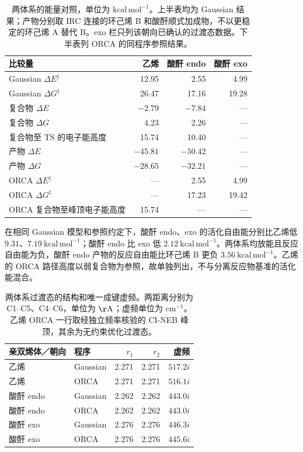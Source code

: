 \documentclass[a4paper,12pt]{article}
\newcommand{\kcalmol}{\mathrm{kcal\,mol^{-1}}}
\begin{document}
\begin{table}[htbp]
\centering\small
\caption{两体系的能量对照，单位为 $\kcalmol$。上半表均为 Gaussian 结果；产物分别取 IRC 连接的环己烯 B 和酸酐顺式加成物，不以更稳定的环己烯 A 替代 B。exo 栏只列该朝向已确认的过渡态数据。下半表列 ORCA 的同程序参照结果。}
\label{tab:systems-energy}
\begin{tabular}{lrrr}
\toprule
比较量 & 乙烯 & 酸酐 endo & 酸酐 exo\\
\midrule
Gaussian $\Delta E^{\ddagger}$ & 12.95 & 2.55 & 4.99\\
Gaussian $\Delta G^{\ddagger}$ & 26.47 & 17.16 & 19.28\\
复合物 $\Delta E$ & $-2.79$ & $-7.84$ & ---\\
复合物 $\Delta G$ & 4.23 & 2.26 & ---\\
复合物至 TS 的电子能高度 & 15.74 & 10.40 & ---\\
产物 $\Delta E$ & $-45.81$ & $-50.42$ & ---\\
产物 $\Delta G$ & $-28.65$ & $-32.21$ & ---\\
\midrule
ORCA $\Delta E^{\ddagger}$ & --- & 2.55 & 4.99\\
ORCA $\Delta G^{\ddagger}$ & --- & 17.23 & 19.42\\
ORCA 复合物至峰顶电子能高度 & 15.74 & --- & ---\\
\bottomrule
\end{tabular}
\end{table}

在相同 Gaussian 模型和参照约定下，酸酐 endo、exo 的活化自由能分别比乙烯低 $9.31$、$7.19\ \kcalmol$；酸酐 endo 比 exo 低 $2.12\ \kcalmol$。两体系均放能且反应自由能为负，酸酐 endo 产物的反应自由能比环己烯 B 更负 $3.56\ \kcalmol$。乙烯的 ORCA 路径高度以弱复合物为参照，故单独列出，不与分离反应物基准的活化能混合。

\begin{table}[htbp]
\centering\small
\caption{两体系过渡态的结构和唯一成键虚频。两距离分别为 C1--C5、C4--C6，单位为 $\mathrm{\AA}$；虚频单位为 $\mathrm{cm^{-1}}$。乙烯 ORCA 一行取经独立频率核验的 CI-NEB 峰顶，其余为无约束优化过渡态。}
\label{tab:systems-ts}
\begin{tabular}{llrrr}
\toprule
亲双烯体／朝向 & 程序 & $r_1$ & $r_2$ & 虚频\\
\midrule
乙烯 & Gaussian & 2.271 & 2.271 & $517.2i$\\
乙烯 & ORCA & 2.271 & 2.271 & $516.1i$\\
酸酐 endo & Gaussian & 2.262 & 2.262 & $443.0i$\\
酸酐 endo & ORCA & 2.262 & 2.262 & $443.0i$\\
酸酐 exo & Gaussian & 2.276 & 2.276 & $446.3i$\\
酸酐 exo & ORCA & 2.276 & 2.276 & $445.6i$\\
\bottomrule
\end{tabular}
\end{table}
\end{document}
